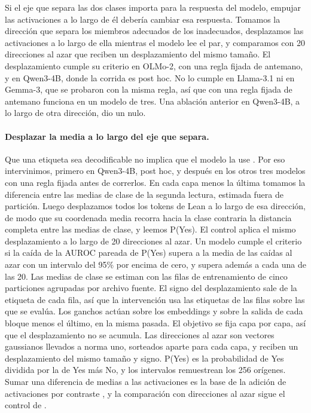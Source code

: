 \documentclass[10pt]{article}
\begin{document}
Si el eje que separa las dos clases importa para la respuesta del modelo, empujar las activaciones a lo largo de él
debería cambiar esa respuesta. Tomamos la dirección que separa los miembros adecuados de los inadecuados, desplazamos
las activaciones a lo largo de ella mientras el modelo lee el par, y comparamos con 20 direcciones al azar que reciben
un desplazamiento del mismo tamaño. El desplazamiento cumple su criterio en OLMo-2, con una regla fijada de antemano,
y en Qwen3-4B, donde la corrida es post hoc. No lo cumple en Llama-3.1 ni en Gemma-3, que se probaron con la misma
regla, así que con una regla fijada de antemano funciona en un modelo de tres. Una ablación anterior en Qwen3-4B, a lo
largo de otra dirección, dio un nulo.

\paragraph{Desplazar la media a lo largo del eje que separa.} Que una etiqueta sea decodificable no implica que el
modelo la use \citep{elazar2021amnesic}. Por eso intervinimos, primero en Qwen3-4B, post hoc, y después en los otros tres modelos con una regla fijada antes de correrlos. En cada capa menos la última tomamos la
diferencia entre las medias de clase de la segunda lectura, estimada fuera de partición. Luego desplazamos todos los
tokens de Lean a lo largo de esa dirección, de modo que su coordenada media recorra hacia la clase contraria la
distancia completa entre las medias de clase, y leemos P(Yes). El control aplica el mismo desplazamiento a lo largo de
20 direcciones al azar. Un modelo cumple el criterio si la caída de la AUROC pareada de P(Yes) supera a la media de
las caídas al azar con un intervalo del 95\% por encima de cero, y supera además a cada una de las 20. Las medias de
clase se estiman con las filas de entrenamiento de cinco particiones agrupadas por archivo fuente. El signo del
desplazamiento sale de la etiqueta de cada fila, así que la intervención usa las etiquetas de las filas sobre las que
se evalúa. Los ganchos actúan sobre los embeddings y sobre la salida de cada bloque menos el último, en la misma
pasada. El objetivo se fija capa por capa, así que el desplazamiento no se acumula. Las direcciones al azar son
vectores gaussianos llevados a norma uno, sorteados aparte para cada capa, y reciben un desplazamiento del mismo
tamaño y signo. P(Yes) es la probabilidad de Yes dividida por la de Yes más No, y los intervalos remuestrean los 256
orígenes. Sumar una diferencia de medias a las activaciones es la base de la adición de activaciones por contraste
\citep{rimsky2024steering}, y la comparación con direcciones al azar sigue el control de \citet{elazar2021amnesic}.
\end{document}
